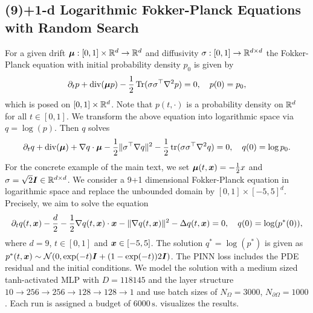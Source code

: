 \subsection{(9)+1-d Logarithmic Fokker-Planck Equations with Random Search}\label{sec:fokker10d-appendix}
For a given drift ${\bm{\mu}}: [0, 1]\times {\mathbb{R}}^d \to {\mathbb{R}}^d$ and diffusivity $\sigma:[0,1]\to{\mathbb{R}}^{d\times d}$
the Fokker-Planck equation with initial probability density $p_0$ is given by
\begin{equation*}
  \partial_t p 
  +
  \operatorname{div}({\bm{\mu}} p) 
  -
  \frac12\operatorname{Tr}(\sigma \sigma^\top \nabla^2 p) 
  =
  0,
  \quad
  p(0)
  =
  p_0,
\end{equation*}
which is posed on $[0, 1]\times {\mathbb{R}}^d$.
Note that $p(t,\cdot)$ is a probability density on ${\mathbb{R}}^d$ for all $t\in[0,1]$. We transform the above equation into logarithmic 
space via $q=\log(p)$. Then $q$ solves
\begin{equation*}
  \partial_t q 
  + 
  \operatorname{div}({\bm{\mu}})
  +
  \nabla q \cdot {\bm{\mu}}
  -
  \frac12 \|\sigma^\top \nabla q\|^2
  -
  \frac12\operatorname{tr}(\sigma\sigma^\top\nabla^2q)
  =
  0,
  \quad
  q(0)
  =
  \log p_0.
\end{equation*}
For the concrete example of the main text, we set ${\bm{\mu}}(t, {\bm{x}})=-\frac12x$ and $\sigma = \sqrt{2}{\bm{I}} \in {\mathbb{R}}^{d\times d}$. 
We consider a 9+1 dimensional Fokker-Planck equation in logarithmic space and replace the unbounded 
domain by $[0, 1]\times [-5, 5]^d$. Precisely, we aim to solve the 
equation
\begin{equation*}
  \partial_t q(t, {\bm{x}})
  -
  \frac{d}{2}
  -
  \frac12 \nabla q(t, {\bm{x}})\cdot {\bm{x}}
  -
  \| \nabla q(t, {\bm{x}}) \|^2
  -
  \Delta q(t, {\bm{x}})
  =
  0,
  \quad 
  q(0) = \log (p^*(0)),
\end{equation*}
where $d=9$, $t\in[0, 1]$ and ${\bm{x}}\in[-5, 5]$. The solution $q^*=\log(p^*)$ is
given as $p^*(t, {\bm{x}}) \sim \mathcal N (0, \exp(-t){\bm{I}} + (1-\exp(-t))2{\bm{I}})$.
The PINN loss includes the PDE residual and the initial conditions.
We model the solution with a medium sized tanh-activated 
MLP with $D=\num{118145}$ and the layer structure
$10 \to 256 \to 256 \to 128 \to 128 \to 1$ and use batch sizes of 
$N_{\Omega} = \num{3000}$, $N_{\partial\Omega} = \num{1000}$. Each run is
assigned a budget of $\num{6000}\,\text{s}$.  visualizes the results.

